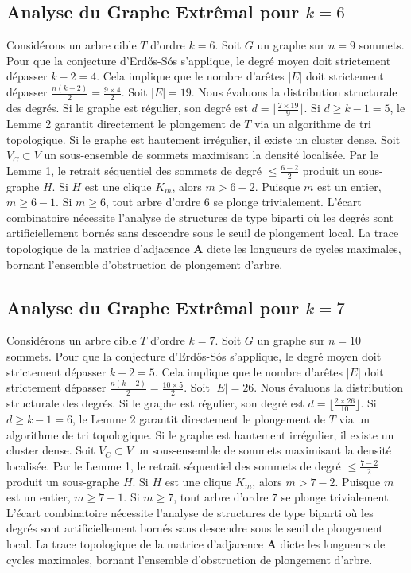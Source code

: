 \documentclass[11pt,a4paper]{article}
\begin{document}
\subsection{Analyse du Graphe Extr\^emal pour $k=6$}
Consid\'erons un arbre cible $T$ d'ordre $k=6$.
Soit $G$ un graphe sur $n=9$ sommets.
Pour que la conjecture d'Erd\H{o}s-S\'os s'applique, le degr\'e moyen doit strictement d\'epasser $k-2 = 4$.
Cela implique que le nombre d'ar\^etes $|E|$ doit strictement d\'epasser $\frac{n(k-2)}{2} = \frac{9 \times 4}{2}$.
Soit $|E| = 19$.
Nous \'evaluons la distribution structurale des degr\'es. Si le graphe est r\'egulier, son degr\'e est $d = \lfloor \frac{2 \times 19}{9} \rfloor$.
Si $d \geq k-1 = 5$, le Lemme 2 garantit directement le plongement de $T$ via un algorithme de tri topologique.
Si le graphe est hautement irr\'egulier, il existe un cluster dense. Soit $V_C \subset V$ un sous-ensemble de sommets maximisant la densit\'e localis\'ee.
Par le Lemme 1, le retrait s\'equentiel des sommets de degr\'e $\leq \frac{6-2}{2}$ produit un sous-graphe $H$.
Si $H$ est une clique $K_{m}$, alors $m > 6-2$. Puisque $m$ est un entier, $m \geq 6-1$. Si $m \geq 6$, tout arbre d'ordre $6$ se plonge trivialement.
L'\'ecart combinatoire n\'ecessite l'analyse de structures de type biparti o\`u les degr\'es sont artificiellement born\'es sans descendre sous le seuil de plongement local. La trace topologique de la matrice d'adjacence $\mathbf{A}$ dicte les longueurs de cycles maximales, bornant l'ensemble d'obstruction de plongement d'arbre.


\subsection{Analyse du Graphe Extr\^emal pour $k=7$}
Consid\'erons un arbre cible $T$ d'ordre $k=7$.
Soit $G$ un graphe sur $n=10$ sommets.
Pour que la conjecture d'Erd\H{o}s-S\'os s'applique, le degr\'e moyen doit strictement d\'epasser $k-2 = 5$.
Cela implique que le nombre d'ar\^etes $|E|$ doit strictement d\'epasser $\frac{n(k-2)}{2} = \frac{10 \times 5}{2}$.
Soit $|E| = 26$.
Nous \'evaluons la distribution structurale des degr\'es. Si le graphe est r\'egulier, son degr\'e est $d = \lfloor \frac{2 \times 26}{10} \rfloor$.
Si $d \geq k-1 = 6$, le Lemme 2 garantit directement le plongement de $T$ via un algorithme de tri topologique.
Si le graphe est hautement irr\'egulier, il existe un cluster dense. Soit $V_C \subset V$ un sous-ensemble de sommets maximisant la densit\'e localis\'ee.
Par le Lemme 1, le retrait s\'equentiel des sommets de degr\'e $\leq \frac{7-2}{2}$ produit un sous-graphe $H$.
Si $H$ est une clique $K_{m}$, alors $m > 7-2$. Puisque $m$ est un entier, $m \geq 7-1$. Si $m \geq 7$, tout arbre d'ordre $7$ se plonge trivialement.
L'\'ecart combinatoire n\'ecessite l'analyse de structures de type biparti o\`u les degr\'es sont artificiellement born\'es sans descendre sous le seuil de plongement local. La trace topologique de la matrice d'adjacence $\mathbf{A}$ dicte les longueurs de cycles maximales, bornant l'ensemble d'obstruction de plongement d'arbre.
\end{document}
